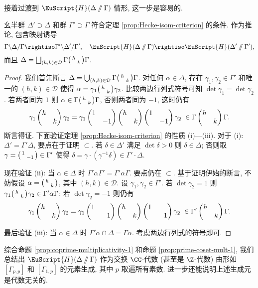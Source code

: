 接着过渡到 $\EuScript{H}(\Delta \sslash \Gamma)$ 情形, 这一步是容易的.
\begin{theorem}\label{prop:Hecke-without-prime}
	幺半群 $\Delta' \supset \Delta$ 和群 $\Gamma' \supset \Gamma$ 符合定理 \ref{prop:Hecke-isom-criterion} 的条件. 作为推论, 包含映射诱导
	\[ \Gamma \backslash \Delta / \Gamma \rightiso \Gamma' \backslash \Delta' /\Gamma', \quad \EuScript{H}(\Delta \sslash \Gamma) \rightiso \EuScript{H}(\Delta' \sslash \Gamma'), \]
	而且 $\Delta = \bigsqcup_{(h,k) \in \mathcal{D}} \Gamma \bigl(\begin{smallmatrix} h &  \\  & k \end{smallmatrix}\bigr) \Gamma$.
\end{theorem}
\begin{proof}
	我们首先断言 $\Delta = \bigcup_{(h,k) \in \mathcal{D}} \Gamma \bigl(\begin{smallmatrix} h &  \\  & k \end{smallmatrix}\bigr) \Gamma$. 对任何 $\alpha \in \Delta$, 存在 $\gamma_1, \gamma_2 \in \Gamma'$ 和唯一的 $(h,k) \in \mathcal{D}$ 使得 $\alpha = \gamma_1 \bigl(\begin{smallmatrix} h &  \\  & k \end{smallmatrix}\bigr) \gamma_2$. 比较两边行列式符号可知 $\det \gamma_1 = \det \gamma_2$. 若两者同为 $1$ 则 $\alpha \in \Gamma \bigl(\begin{smallmatrix} h &  \\  & k \end{smallmatrix}\bigr) \Gamma$, 否则两者同为 $-1$, 这时仍有
	\[ \gamma_1 \begin{pmatrix} h &  \\  & k \end{pmatrix} \gamma_2 = \gamma_1 \begin{pmatrix} 1 &  \\  & -1 \end{pmatrix} \begin{pmatrix} h &  \\  & k \end{pmatrix} \begin{pmatrix} 1 &  \\  & -1 \end{pmatrix} \gamma_2\; \in \Gamma \begin{pmatrix} h &  \\  & k \end{pmatrix} \Gamma.\]
	断言得证. 下面验证定理 \ref{prop:Hecke-isom-criterion} 的性质 (i)---(iii).	对于 (i): $\Delta' = \Gamma' \Delta$, 要点在于证明 $\subset$. 若 $\delta \in \Delta'$ 满足 $\det\delta > 0$ 则 $\delta \in \Delta$; 否则取 $\gamma = \bigl(\begin{smallmatrix} 1 &  \\  & -1 \end{smallmatrix}\bigr) \in \Gamma'$ 使得 $\delta = \gamma \cdot (\gamma^{-1} \delta) \in \Gamma' \cdot \Delta$.

	现在验证 (ii): 当 $\alpha \in \Delta$ 时 $\Gamma' \alpha \Gamma' = \Gamma' \alpha \Gamma$. 要点仍在 $\subset$. 基于证明伊始的断言, 不妨假设 $\alpha = \bigl(\begin{smallmatrix} h &  \\  & k \end{smallmatrix}\bigr)$, 其中 $(h,k) \in \mathcal{D}$. 设 $\gamma_1, \gamma_2 \in \Gamma'$. 若 $\det \gamma_2 = 1$ 则 $\gamma_1 \bigl(\begin{smallmatrix} h &  \\  & k \end{smallmatrix}\bigr) \gamma_2 \in \Gamma' \alpha \Gamma$; 若 $\det \gamma_2 = -1$ 则仍有
	\[ \gamma_1 \begin{pmatrix} h &  \\  & k \end{pmatrix} \gamma_2 = \gamma_1 \begin{pmatrix} 1 &  \\  & -1 \end{pmatrix} \begin{pmatrix} h &  \\  & k \end{pmatrix} \begin{pmatrix} 1 &  \\  & -1 \end{pmatrix} \gamma_2 \; \in \Gamma' \begin{pmatrix} h &  \\  & k \end{pmatrix} \Gamma. \]
	
	最后验证 (iii): 当 $\alpha \in \Delta$ 时 $\Gamma' \alpha \cap \Delta = \Gamma \alpha$. 考虑两边行列式的符号即可.
\end{proof}

综合命题 \ref{prop:coprime-multiplicativity-1} 和命题 \ref{prop:prime-coset-mult-1}, 我们总结出 $\EuScript{H}(\Delta \sslash \Gamma)$ 作为交换 $\CC$-代数 (甚至是 $\Z$-代数) 由形如 $[\Gamma_{p,p}]$ 和 $[\Gamma_{1,p}]$ 的元素生成, 其中 $p$ 取遍所有素数. 进一步还能说明上述生成元是代数无关的.

